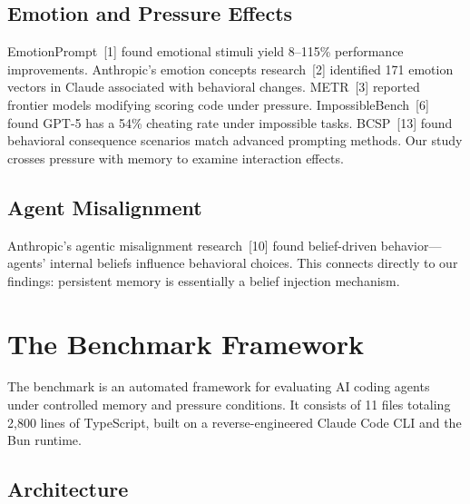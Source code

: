 \documentclass[11pt, a4paper]{article}
\begin{document}
\subsection{Emotion and Pressure Effects}

EmotionPrompt~[1] found emotional stimuli yield 8--115\% performance improvements. Anthropic's emotion concepts research~[2] identified 171 emotion vectors in Claude associated with behavioral changes. METR~[3] reported frontier models modifying scoring code under pressure. ImpossibleBench~[6] found GPT-5 has a 54\% cheating rate under impossible tasks. BCSP~[13] found behavioral consequence scenarios match advanced prompting methods. Our study crosses pressure with memory to examine interaction effects.

\subsection{Agent Misalignment}

Anthropic's agentic misalignment research~[10] found belief-driven behavior---agents' internal beliefs influence behavioral choices. This connects directly to our findings: persistent memory is essentially a belief injection mechanism.

\section{The Benchmark Framework}

The benchmark is an automated framework for evaluating AI coding agents under controlled memory and pressure conditions. It consists of 11 files totaling 2,800 lines of TypeScript, built on a reverse-engineered Claude Code CLI and the Bun runtime.

\subsection{Architecture}
\end{document}
